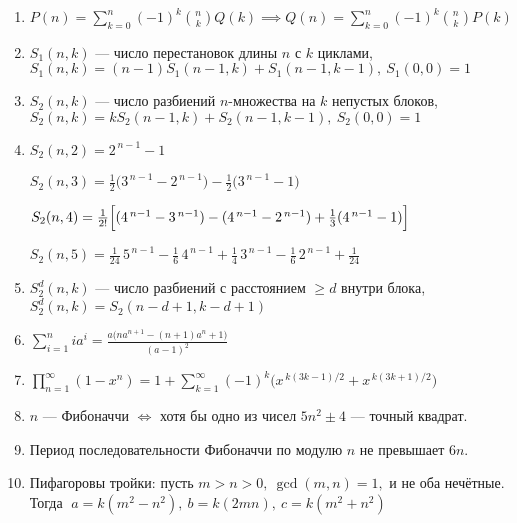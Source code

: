 \begin{enumerate}
\item %
$P(n)=\sum_{k=0}^{n}(-1)^k\binom{n}{k}Q(k) \implies Q(n)=\sum_{k=0}^{n}(-1)^k\binom{n}{k}P(k)$

\item %
$S_1(n,k)$ — число перестановок длины $n$ с $k$ циклами,
$S_1(n,k)=(n-1)S_1(n-1,k)+S_1(n-1,k-1),\ S_1(0,0)=1$

\item %
$S_2(n,k)$ — число разбиений $n$-множества на $k$ непустых блоков,
$S_2(n,k)=kS_2(n-1,k)+S_2(n-1,k-1),\ S_2(0,0)=1$

\item %
$S_2(n,2)=2^{\,n-1}-1$

$S_2(n,3)=\tfrac{1}{2}\bigl(3^{\,n-1}-2^{\,n-1}\bigr)-\tfrac{1}{2}\bigl(3^{\,n-1}-1\bigr)$

$S_2(n,4)=\tfrac{1}{2!}\Bigl[(4^{\,n-1}-3^{\,n-1})-(4^{\,n-1}-2^{\,n-1})+\tfrac{1}{3}(4^{\,n-1}-1)\Bigr]$

$S_2(n,5)=\tfrac{1}{24}\,5^{\,n-1}-\tfrac{1}{6}\,4^{\,n-1}
+\tfrac{1}{4}\,3^{\,n-1}-\tfrac{1}{6}\,2^{\,n-1}+\tfrac{1}{24}$

\item %
$S_2^d(n,k)$ — число разбиений с расстоянием $\ge d$ внутри блока,
$S_2^d(n,k)=S_2(n-d+1,k-d+1)$

\item %
$\sum_{i=1}^n i a^i=\frac{a\bigl(n a^{n+1}-(n+1)a^n+1\bigr)}{(a-1)^2}$

\item %
$\prod_{n=1}^\infty(1-x^n)=1+\sum_{k=1}^{\infty}(-1)^k\bigl(x^{\,k(3k-1)/2}+x^{\,k(3k+1)/2}\bigr)$

\item %
$n$ — Фибоначчи $\iff$ хотя бы одно из чисел $5n^2\pm4$ — точный квадрат.

\item %
Период последовательности Фибоначчи по модулю $n$ не превышает $6n$.

\item %
Пифагоровы тройки: пусть $m>n>0,\ \gcd(m,n)=1,$ и не оба нечётные. Тогда
$\;a=k(m^2-n^2),\ b=k(2mn),\ c=k(m^2+n^2)$



\end{enumerate}
